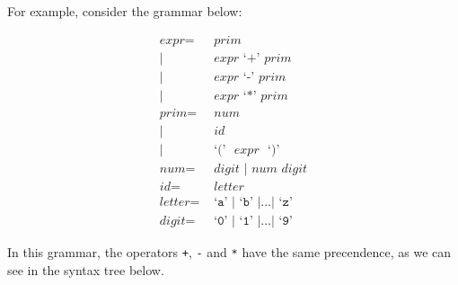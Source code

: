 \documentclass[a4paper, openany]{memoir}
\begin{document}
For example, consider the grammar below:
\begin{figure}[H]
    \centering
    \begin{align*}
        \textit{expr} =& \textit{  prim} \\
        |\hspace{2pt} & \textit{ expr} \text{ `}\texttt{+}\text{' } \textit{prim} \\
        |\hspace{2pt} & \textit{ expr} \text{ `}\texttt{-}\text{' } \textit{prim} \\
        |\hspace{2pt} & \textit{ expr} \text{ `}\texttt{*}\text{' } \textit{prim} \\
        \textit{prim} =& \textit{ num} \\
        |\hspace{2pt} & \textit{ id} \\
        |\hspace{2pt} & \text{ `}\texttt{(}\text{' } \textit{ expr } \text{ `}\texttt{)}\text{'} \\
        \textit{num} =& \textit{ digit } | \textit{ num digit} \\
        \textit{id} =& \textit{ letter} \\
        \textit{letter} =& \text{ `}\texttt{a}\text{' } | \text{ `}\texttt{b}\text{' } | \dots | \text{ `}\texttt{z}\text{' } \\
        \textit{digit} =& \text{ `}\texttt{0}\text{' } | \text{ `}\texttt{1}\text{' } | \dots | \text{ `}\texttt{9}\text{'} 
    \end{align*}
\end{figure}
\noindent In this grammar, the operators \texttt{+}, \texttt{-} and \texttt{*} have the same precendence, as we can see in the syntax tree below.
\end{document}
